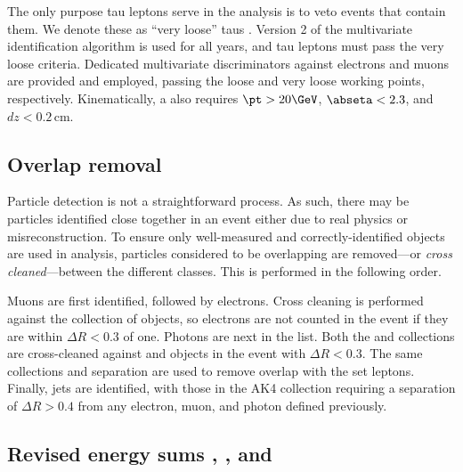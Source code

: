 The only purpose tau leptons \Ptau serve in the analysis is to veto events that contain them. We denote these as ``very loose'' taus \vlooseTau. Version 2 of the multivariate identification algorithm is used for all years, and tau leptons must pass the very loose criteria. Dedicated multivariate discriminators against electrons and muons are provided and employed, passing the loose and very loose working points, respectively. Kinematically, a \vlooseTau also requires $\pt > \text{20}\GeV$, $\abseta < \text{2.3}$, and $dz <\text{0.2}$\,cm.





\subsection{Overlap removal}
\label{subsec:objects_cross_cleaning}

Particle detection is not a straightforward process. As such, there may be particles identified close together in an event either due to real physics or misreconstruction. To ensure only well-measured and correctly-identified objects are used in analysis, particles considered to be overlapping are removed---or \emph{cross cleaned}---between the different classes. This is performed in the following order.

Muons are first identified, followed by electrons. Cross cleaning is performed against the \looseMuon collection of objects, so electrons are not counted in the event if they are within $\Delta R < \text{0.3}$ of one. Photons are next in the list. Both the \loosePhoton and \mediumPhoton collections are cross-cleaned against \looseMuon and \vetoEle objects in the event with $\Delta R < \text{0.3}$. The same collections and separation are used to remove overlap with the set \vlooseTau leptons. Finally, \glspl{jet} are identified, with those in the AK4 collection requiring a separation of $\Delta R > \text{0.4}$ from any electron, muon, and photon defined previously.




\subsection{Revised energy sums \texorpdfstring{\ptvecmiss}{ptmiss}, \texorpdfstring{\HT}{HT}, and \texorpdfstring{\htvecmiss}{MHT}}
\label{subsec:objects_analysis_energy_sums}

